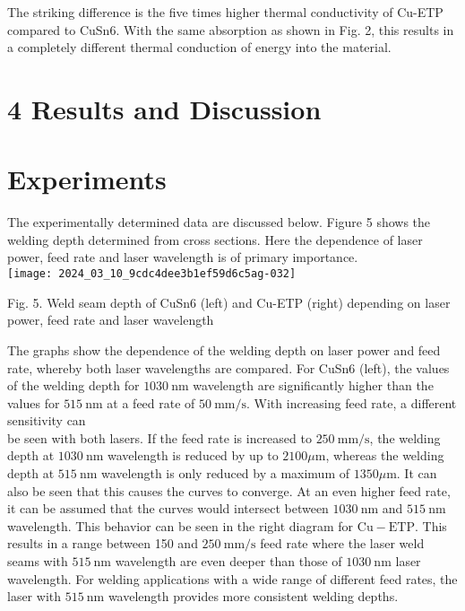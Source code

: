 \documentclass[10pt]{article}
\begin{document}
The striking difference is the five times higher thermal conductivity of Cu-ETP compared to CuSn6. With the same absorption as shown in Fig. 2, this results in a completely different thermal conduction of energy into the material.

\section*{4 Results and Discussion}
\section*{Experiments}
The experimentally determined data are discussed below. Figure 5 shows the welding depth determined from cross sections. Here the dependence of laser power, feed rate and laser wavelength is of primary importance.\\
\texttt{[image: 2024\_03\_10\_9cdc4dee3b1ef59d6c5ag-032]}

Fig. 5. Weld seam depth of CuSn6 (left) and Cu-ETP (right) depending on laser power, feed rate and laser wavelength

The graphs show the dependence of the welding depth on laser power and feed rate, whereby both laser wavelengths are compared. For CuSn6 (left), the values of the welding depth for $1030 \mathrm{~nm}$ wavelength are significantly higher than the values for $515 \mathrm{~nm}$ at a feed rate of $50 \mathrm{~mm} / \mathrm{s}$. With increasing feed rate, a different sensitivity can\\
be seen with both lasers. If the feed rate is increased to $250 \mathrm{~mm} / \mathrm{s}$, the welding depth at $1030 \mathrm{~nm}$ wavelength is reduced by up to $2100 \mu \mathrm{m}$, whereas the welding depth at $515 \mathrm{~nm}$ wavelength is only reduced by a maximum of $1350 \mu \mathrm{m}$. It can also be seen that this causes the curves to converge. At an even higher feed rate, it can be assumed that the curves would intersect between $1030 \mathrm{~nm}$ and $515 \mathrm{~nm}$ wavelength. This behavior can be seen in the right diagram for $\mathrm{Cu}-\mathrm{ETP}$. This results in a range between 150 and $250 \mathrm{~mm} / \mathrm{s}$ feed rate where the laser weld seams with $515 \mathrm{~nm}$ wavelength are even deeper than those of $1030 \mathrm{~nm}$ laser wavelength. For welding applications with a wide range of different feed rates, the laser with $515 \mathrm{~nm}$ wavelength provides more consistent welding depths.
\end{document}
